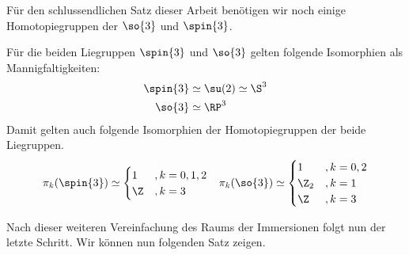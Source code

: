 Für den schlussendlichen Satz dieser Arbeit benötigen wir
noch einige Homotopiegruppen der $\so{3}$ und $\spin{3}$.
\begin{Lem}\label{hgroups}
	Für die beiden Liegruppen $\spin{3}$ und $\so{3}$ gelten
	folgende Isomorphien als Mannigfaltigkeiten:
	\begin{align*}
	\spin{3} &\simeq \su(2) \simeq \S^3 \\
	\so{3} &\simeq \RP^3
	\end{align*}
	Damit gelten auch folgende Isomorphien der Homotopiegruppen
	der beide Liegruppen.
	\begin{align*}
	\pi_k(\spin{3}) &\simeq \begin{cases}
	1 & ,k=0,1,2 \\
	\Z & ,k=3
	\end{cases}
	&{\pi_k(\so{3}) \simeq \begin{cases}
		1 & ,k=0,2 \\
		\Z_2 & ,k=1 \\
		\Z & ,k=3
		\end{cases}}
	\end{align*}
\end{Lem}

Nach dieser weiteren Vereinfachung des Raums der Immersionen folgt
nun der letzte Schritt. Wir können nun folgenden Satz zeigen.



